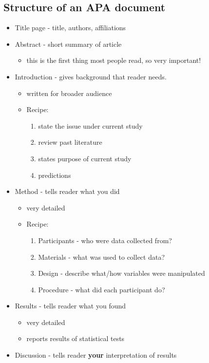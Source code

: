 \documentclass[11pt]{article}
\begin{document}
\subsection*{Structure of an APA document}
\label{sec-3-6}
\begin{itemize}
\item Title page - title, authors, affiliations
\item Abstract - short summary of article
\begin{itemize}
\item this is the first thing most people read, so very important!
\end{itemize}
\item Introduction - gives background that reader needs. 
\begin{itemize}
\item written for broader audience
\item Recipe:
\begin{enumerate}
\item state the issue under current study
\item review past literature
\item states purpose of current study
\item predictions
\end{enumerate}
\end{itemize}
\item Method - tells reader what you did
\begin{itemize}
\item very detailed
\item Recipe:
\begin{enumerate}
\item Participants - who were data collected from?
\item Materials - what was used to collect data?
\item Design - describe what/how variables were manipulated
\item Procedure - what did each participant do?
\end{enumerate}
\end{itemize}
\item Results - tells reader what you found
\begin{itemize}
\item very detailed
\item reports results of statistical tests
\end{itemize}
\item Discussion - tells reader \textbf{your} interpretation of results

\end{itemize}
\end{document}
